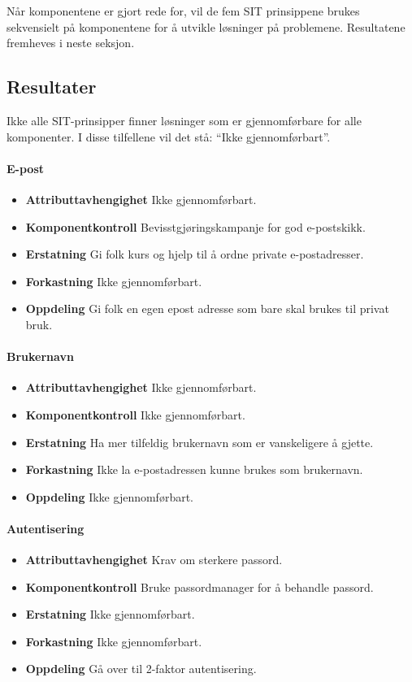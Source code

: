 Når komponentene er gjort rede for, vil de fem SIT prinsippene brukes sekvensielt på komponentene for å utvikle løsninger på problemene. Resultatene fremheves i neste seksjon. 


\subsection{Resultater}
Ikke alle SIT-prinsipper finner løsninger som er gjennomførbare for alle komponenter. I disse tilfellene vil det stå: ``Ikke gjennomførbart''. 

\paragraph{E-post}
\begin{itemize}
    \item \textbf{Attributtavhengighet} Ikke gjennomførbart.
    \item \textbf{Komponentkontroll} Bevisstgjøringskampanje for god e-postskikk.
    \item \textbf{Erstatning} Gi folk kurs og hjelp til å ordne private e-postadresser.
    \item \textbf{Forkastning} Ikke gjennomførbart.
    \item \textbf{Oppdeling} Gi folk en egen epost adresse som bare skal brukes til privat bruk.
\end{itemize}

\paragraph{Brukernavn}
\begin{itemize}
    \item \textbf{Attributtavhengighet} Ikke gjennomførbart.
    \item \textbf{Komponentkontroll} Ikke gjennomførbart.
    \item \textbf{Erstatning} Ha mer tilfeldig brukernavn som er vanskeligere å gjette.
    \item \textbf{Forkastning} Ikke la e-postadressen kunne brukes som brukernavn.
    \item \textbf{Oppdeling} Ikke gjennomførbart.
\end{itemize}

\paragraph{Autentisering}
\begin{itemize}
    \item \textbf{Attributtavhengighet} Krav om sterkere passord.
    \item \textbf{Komponentkontroll} Bruke passordmanager for å behandle passord. 
    \item \textbf{Erstatning} Ikke gjennomførbart.
    \item \textbf{Forkastning} Ikke gjennomførbart.
    \item \textbf{Oppdeling} Gå over til 2-faktor autentisering.
\end{itemize}

